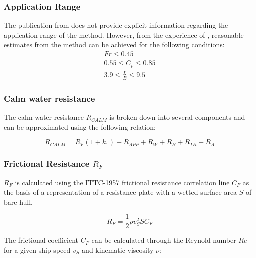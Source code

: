 \subsubsection*{Application Range}

The publication from  does not provide explicit information regarding the application range of the method. However, from the experience of , reasonable estimates from the method can be achieved for the following conditions: \\

\begin{equation}
    \begin{gathered}
        Fr \leqslant 0.45 \\
        0.55 \leqslant C_p \leqslant 0.85 \\
        3.9 \leqslant \frac{L}{B} \leqslant 9.5
    \end{gathered}
\end{equation}

\subsubsection{Calm water resistance}\label{sec:Calm_Resistance}

The calm water resistance $R_{CALM}$ is broken down into several components and can be approximated using the following relation:

\begin{equation}\label{R_calm}
    R_{CALM} = R_F(1+k_1) + R_{APP} + R_W + R_B + R_{TR} + R_A
\end{equation}

\subsubsection*{Frictional Resistance $R_F$}

\textbf{$R_F$} is calculated using the ITTC-1957 frictional resistance correlation line $C_F$ as the basis of a representation of a resistance plate with a wetted surface area $S$ of bare hull. 

\begin{equation}\label{eqn:_R_f}
    R_F = \frac{1}{2}\rho v_{S}^2 S C_F 
\end{equation}

The frictional coefficient $C_F$ can be calculated through the Reynold number $Re$ for a given ship speed $v_{S}$ and kinematic viscosity $\nu$:


